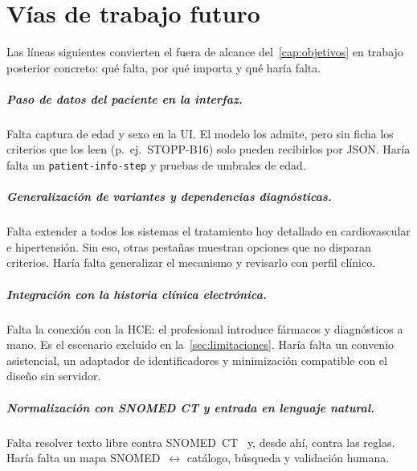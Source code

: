 
\chapter{Vías de trabajo futuro}
\label{cap:futuro}

Las líneas siguientes convierten el fuera de alcance del~\cref{cap:objetivos}
en trabajo posterior concreto: qué falta, por qué importa y qué haría falta.

\paragraph{Paso de datos del paciente en la interfaz.}
Falta captura de edad y sexo en la UI. El modelo los admite, pero sin ficha
los criterios que los leen (p.~ej.\ STOPP-B16) solo pueden recibirlos por
JSON. Haría falta un \texttt{patient-info-step} y pruebas de umbrales de
edad.

\paragraph{Generalización de variantes y dependencias diagnósticas.}
Falta extender a todos los sistemas el tratamiento hoy detallado en
cardiovascular e hipertensión. Sin eso, otras pestañas muestran opciones
que no disparan criterios. Haría falta generalizar el mecanismo y revisarlo
con perfil clínico.

\paragraph{Integración con la historia clínica electrónica.}
Falta la conexión con la HCE: el profesional introduce fármacos y
diagnósticos a mano. Es el escenario excluido en la~\cref{sec:limitaciones}.
Haría falta un convenio asistencial, un adaptador de identificadores y
minimización compatible con el diseño sin servidor.

\paragraph{Normalización con SNOMED CT y entrada en lenguaje natural.}
Falta resolver texto libre contra SNOMED~CT~\cite{snomedStarter} y, desde
ahí, contra las reglas. Haría falta un mapa SNOMED~$\leftrightarrow$ catálogo,
búsqueda y validación humana.

